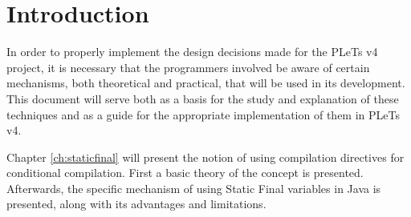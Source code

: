 \chapter*{Introduction}

In order to properly implement the design decisions made for the PLeTs v4 project, it is necessary that the programmers involved be aware of certain mechanisms, both theoretical and practical, that will be used in its development. This document will serve both as a basis for the study and explanation of these techniques and as a guide for the appropriate implementation of them in PLeTs v4.

Chapter \ref{ch:staticfinal} will present the notion of using compilation directives for conditional compilation. First a basic theory of the concept is presented. Afterwards, the specific mechanism of using Static Final variables in Java is presented, along with its advantages and limitations.
